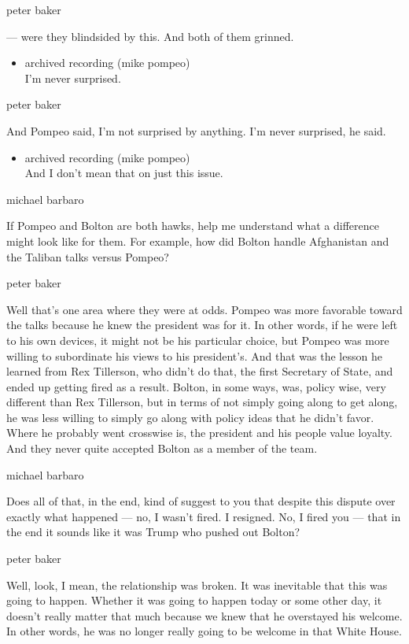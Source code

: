 peter baker

--- were they blindsided by this. And both of them grinned.

\begin{itemize}
\tightlist
\item
  archived recording (mike pompeo)\\
  I'm never surprised.
\end{itemize}

peter baker

And Pompeo said, I'm not surprised by anything. I'm never surprised, he
said.

\begin{itemize}
\tightlist
\item
  archived recording (mike pompeo)\\
  And I don't mean that on just this issue.
\end{itemize}

michael barbaro

If Pompeo and Bolton are both hawks, help me understand what a
difference might look like for them. For example, how did Bolton handle
Afghanistan and the Taliban talks versus Pompeo?

peter baker

Well that's one area where they were at odds. Pompeo was more favorable
toward the talks because he knew the president was for it. In other
words, if he were left to his own devices, it might not be his
particular choice, but Pompeo was more willing to subordinate his views
to his president's. And that was the lesson he learned from Rex
Tillerson, who didn't do that, the first Secretary of State, and ended
up getting fired as a result. Bolton, in some ways, was, policy wise,
very different than Rex Tillerson, but in terms of not simply going
along to get along, he was less willing to simply go along with policy
ideas that he didn't favor. Where he probably went crosswise is, the
president and his people value loyalty. And they never quite accepted
Bolton as a member of the team.

michael barbaro

Does all of that, in the end, kind of suggest to you that despite this
dispute over exactly what happened --- no, I wasn't fired. I resigned.
No, I fired you --- that in the end it sounds like it was Trump who
pushed out Bolton?

peter baker

Well, look, I mean, the relationship was broken. It was inevitable that
this was going to happen. Whether it was going to happen today or some
other day, it doesn't really matter that much because we knew that he
overstayed his welcome. In other words, he was no longer really going to
be welcome in that White House.

